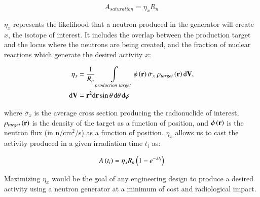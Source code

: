 \begin{equation}
A_{saturation} = \eta_x R_n
\end{equation}

$\eta_x$ represents the likelihood that a neutron produced in the generator will create $x$, the isotope of interest. 
It includes the overlap between the production target and the locus where the neutrons are being created, and the fraction of nuclear reactions which generate the desired activity $x$: 



\begin{align}
\eta_x &= \dfrac{1}{R_n} \int\displaylimits_{production\ target} \phi\pp{\mathbf{r}}\bar{\sigma}_x\ \rho_{target}\pp{\mathbf{r}}\text{d}\mathbf{V}, \nonumber\\
\text{d}\mathbf{V} &= \mathbf{r}^2 \text{d}\mathbf{r} \sin{\theta}\, \text{d}\theta\, \text{d}\varphi 
\end{align}


where $\bar{\sigma}_x$ is the average cross section producing the radionuclide of interest, $\rho_{target}\left( \mathbf{r}\right)$ is the density of the target as a function of position, and $\phi\left( \mathbf{r}\right)$ is the neutron flux (in n/cm$^2$/s) as a function of position.   $\eta_x$ allows us to cast the activity produced in a given irradiation time $t_i$ as:

\begin{equation}
A\left( t_i\right) = \eta_x R_n \left( 1-e^{-\lambda t_i}\right)
\end{equation}


Maximizing $\eta_x$ would be the goal of any engineering design to produce a desired activity using a neutron generator at a minimum of cost and radiological impact. 
 
